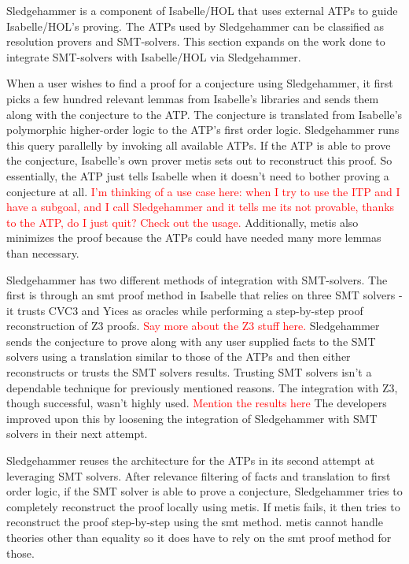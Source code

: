 \documentclass{article}
\begin{document}
	Sledgehammer is a component of Isabelle/HOL that uses 
	external ATPs to guide Isabelle/HOL's proving. The ATPs 
	used by Sledgehammer can be classified as resolution 
	provers and SMT-solvers. This section expands on the work 
	done to integrate SMT-solvers with Isabelle/HOL via 
	Sledgehammer.
	
	When a user wishes to find a proof for a conjecture using 
	Sledgehammer, it first picks a few hundred relevant 
	lemmas from Isabelle's libraries and sends them along 
	with the conjecture to the ATP. The conjecture is 
	translated from Isabelle's polymorphic higher-order 
	logic to the ATP's first order logic. Sledgehammer 
	runs this query parallelly by invoking all available 
	ATPs. If the ATP is able to prove the conjecture, 
	Isabelle's own prover metis sets out to reconstruct 
	this proof. So essentially, the ATP just tells Isabelle 
	when it doesn't need to bother proving a conjecture at 
	all. \textcolor{red}{I'm thinking of a use case here: 
	when I try to use the ITP and I have a subgoal, and I 
	call Sledgehammer and it tells me its not provable, 
	thanks to the ATP, do I just quit? Check out the usage.}
	Additionally, metis also minimizes the proof because 
	the ATPs could have needed many more lemmas than necessary.
	
	Sledgehammer has two different methods of integration 
	with SMT-solvers. The first is through an smt proof 
	method in Isabelle that relies on three SMT solvers - 
	it trusts CVC3 and Yices as oracles while performing 
	a step-by-step proof reconstruction of Z3 proofs. 
	\textcolor{red}{Say more about the Z3 stuff here.}
	Sledgehammer sends the conjecture to prove along 
	with any user supplied facts to the SMT solvers 
	using a translation similar to those of the ATPs 
	and then either reconstructs or trusts the SMT solvers
	results. Trusting SMT solvers isn't a dependable 
	technique for previously mentioned reasons. The integration
	with Z3, though successful, wasn't highly used. 
	\textcolor{red}{Mention the results here} The developers
	improved upon this by loosening the integration of 
	Sledgehammer with SMT solvers in their next attempt.
	
	Sledgehammer reuses the architecture for the ATPs 
	in its second attempt at leveraging SMT solvers. 
	After relevance filtering of facts and translation to 
	first order logic, if the SMT solver is able to
	prove a conjecture, Sledgehammer tries to completely
	reconstruct the proof locally using metis. If metis fails,
	it then tries to reconstruct the proof step-by-step using 
	the smt method. metis cannot handle theories other 
	than equality so it does have to rely on the smt proof
	method for those.
	
\end{document}
